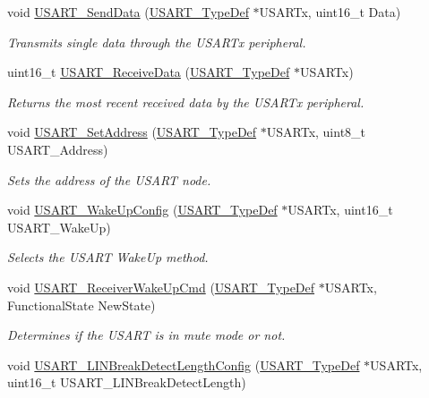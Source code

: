 \begin{DoxyCompactItemize}
void \hyperlink{group___u_s_a_r_t_ga0b43d42da9540f446d494bf69823c6fb}{U\+S\+A\+R\+T\+\_\+\+Send\+Data} (\hyperlink{struct_u_s_a_r_t___type_def}{U\+S\+A\+R\+T\+\_\+\+Type\+Def} $\ast$U\+S\+A\+R\+Tx, uint16\+\_\+t Data)
\begin{DoxyCompactList}\small\item\em Transmits single data through the U\+S\+A\+R\+Tx peripheral. \end{DoxyCompactList}\item 
uint16\+\_\+t \hyperlink{group___u_s_a_r_t_gac67a91845b0b1d54d31bdfb1c5e9867c}{U\+S\+A\+R\+T\+\_\+\+Receive\+Data} (\hyperlink{struct_u_s_a_r_t___type_def}{U\+S\+A\+R\+T\+\_\+\+Type\+Def} $\ast$U\+S\+A\+R\+Tx)
\begin{DoxyCompactList}\small\item\em Returns the most recent received data by the U\+S\+A\+R\+Tx peripheral. \end{DoxyCompactList}\item 
void \hyperlink{group___u_s_a_r_t_ga65ec9928817f3f031dd9a4dfc95d6666}{U\+S\+A\+R\+T\+\_\+\+Set\+Address} (\hyperlink{struct_u_s_a_r_t___type_def}{U\+S\+A\+R\+T\+\_\+\+Type\+Def} $\ast$U\+S\+A\+R\+Tx, uint8\+\_\+t U\+S\+A\+R\+T\+\_\+\+Address)
\begin{DoxyCompactList}\small\item\em Sets the address of the U\+S\+A\+RT node. \end{DoxyCompactList}\item 
void \hyperlink{group___u_s_a_r_t_ga4965417c2412c36e462fcad50a8d5393}{U\+S\+A\+R\+T\+\_\+\+Wake\+Up\+Config} (\hyperlink{struct_u_s_a_r_t___type_def}{U\+S\+A\+R\+T\+\_\+\+Type\+Def} $\ast$U\+S\+A\+R\+Tx, uint16\+\_\+t U\+S\+A\+R\+T\+\_\+\+Wake\+Up)
\begin{DoxyCompactList}\small\item\em Selects the U\+S\+A\+RT Wake\+Up method. \end{DoxyCompactList}\item 
void \hyperlink{group___u_s_a_r_t_gac27b78ce445a16fe33851d2f87781c02}{U\+S\+A\+R\+T\+\_\+\+Receiver\+Wake\+Up\+Cmd} (\hyperlink{struct_u_s_a_r_t___type_def}{U\+S\+A\+R\+T\+\_\+\+Type\+Def} $\ast$U\+S\+A\+R\+Tx, Functional\+State New\+State)
\begin{DoxyCompactList}\small\item\em Determines if the U\+S\+A\+RT is in mute mode or not. \end{DoxyCompactList}\item 
void \hyperlink{group___u_s_a_r_t_ga7bc2d291831cbc5e53e73337308029b5}{U\+S\+A\+R\+T\+\_\+\+L\+I\+N\+Break\+Detect\+Length\+Config} (\hyperlink{struct_u_s_a_r_t___type_def}{U\+S\+A\+R\+T\+\_\+\+Type\+Def} $\ast$U\+S\+A\+R\+Tx, uint16\+\_\+t U\+S\+A\+R\+T\+\_\+\+L\+I\+N\+Break\+Detect\+Length)

\end{DoxyCompactItemize}

